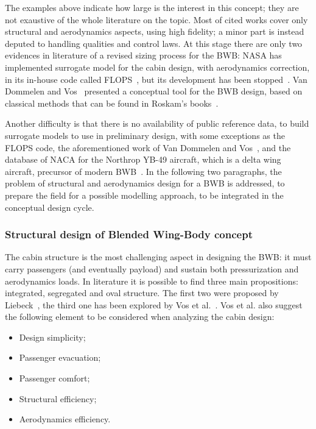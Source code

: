 The examples above indicate how large is the interest in this concept; they are not exaustive of the whole literature on the topic.
Most of cited works cover only structural and aerodynamics aspects, using high fidelity; a minor part is instead deputed to handling qualities and control laws. 
At this stage there are only two evidences in literature of a revised sizing process for the BWB: NASA has implemented surrogate model for the cabin design, with aerodynamics correction, in its in-house code called FLOPS~\cite{bib:bradley_bwb}, but its development has been stopped~\cite{bib:brelje_biblio}.
Van Dommelen and Vos~\cite{bib:van_dommelen} presented a conceptual tool for the BWB design, based on classical methods that can be found in Roskam's books~\cite{bib:roskam_partI}. 

Another difficulty is that there is no availability of public reference data, to build surrogate models to use in preliminary design, with some exceptions as the FLOPS code, the aforementioned work of Van Dommelen and Vos~\cite{bib:van_dommelen}, and the database of NACA for the Northrop YB-49 aircraft, which is a delta wing aircraft, precursor of modern BWB~\cite{bib:robinson, bib:ashkenas}.
In the following two paragraphs, the problem of structural and aerodynamics design for a BWB is addressed, to prepare the field for a possible modelling approach, to be integrated in the conceptual design cycle.

\subsubsection{Structural design of Blended Wing-Body concept}
\label{subsubsec:chap1_bwb_structure}

The cabin structure is the most challenging aspect in designing the BWB: it must carry passengers (and eventually payload) and sustain both pressurization and aerodynamics loads. 
In literature it is possible to find three main propositions: integrated, segregated and oval structure. 
The first two were proposed by Liebeck~\cite{bib:liebeck_1998}, the third one has been explored by Vos et al.~\cite{bib:vos_bwb}. 
Vos et al. also suggest the following element to be considered when analyzing the cabin design:
\begin{itemize}
	\item Design simplicity; 
	\item Passenger evacuation;
	\item Passenger comfort;
	\item Structural efficiency; 
	\item Aerodynamics efficiency.
\end{itemize} 

